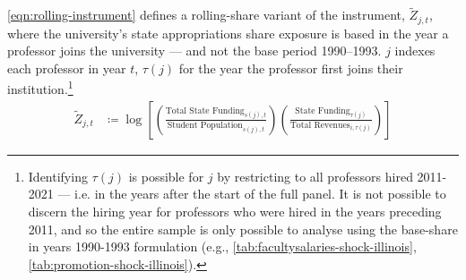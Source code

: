 \documentclass[notitlepage,12pt]{article}
\renewcommand{\tilde}[1]{\widetilde{#1}}                                   %
\begin{document}
\autoref{eqn:rolling-instrument} defines a rolling-share variant of the instrument, $\tilde Z_{j,t}$, where the university's state appropriations share exposure is based in the year a professor joins the university --- and not the base period 1990--1993.
$j$ indexes each professor in year $t$, $\tau(j)$ for the year the professor first joins their institution.\footnote{
    Identifying $\tau(j)$ is possible for $j$ by restricting to all professors hired 2011-2021 --- i.e. in the years after the start of the full panel.
    It is not possible to discern the hiring year for professors who  were hired in the years preceding 2011, and so the entire sample is only possible to analyse using the base-share in years 1990-1993 formulation (e.g., \autoref{tab:facultysalaries-shock-illinois}, \ref{tab:promotion-shock-illinois}).
}
\begin{align}
    \label{eqn:rolling-instrument}
    \tilde Z_{j,t} &\coloneqq \log \left[
    \left( \frac{\text{Total State Funding}_{s(j),t}}{\text{Student Population}_{s(j),t}} \right)
    \left( \frac{\text{State Funding}_{\tau(j)}}{\text{Total Revenues}_{i,\tau(j)}} \right) \right]
\end{align}
\end{document}
